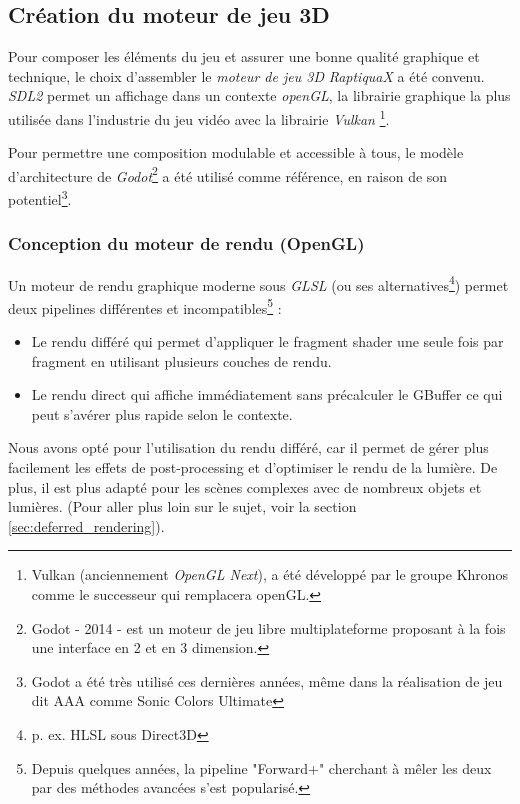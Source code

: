 \subsection{Création du moteur de jeu 3D}
    Pour composer les éléments du jeu et assurer une bonne qualité
    graphique et technique, le choix d'assembler le \emph{moteur de jeu 3D}
    \og \emph{RaptiquaX} \fg{} a été convenu. \emph{\Gls{SDL2}} permet un affichage dans un contexte
    \emph{\Gls{openGL}}, la librairie graphique la plus utilisée dans
    l'industrie du jeu vidéo avec la librairie \emph{Vulkan}
    \footnote{Vulkan \small{(anciennement \emph{OpenGL Next})}, a été
    développé par le groupe Khronos comme le successeur qui remplacera
    \Gls{openGL}.}.

    Pour permettre une composition modulable et accessible à tous, le modèle
    d'architecture de \emph{Godot}\footnote{Godot - 2014 - est un moteur de
    jeu libre multiplateforme proposant à la fois une interface en 2 et
    en 3 dimension.} a été utilisé comme référence, en raison de son
    potentiel\footnote{Godot a été très utilisé ces dernières années, même
    dans la réalisation de jeu dit AAA comme
    Sonic Colors Ultimate\cite{soniccoloru} }.

\subsubsection{Conception du moteur de rendu (OpenGL)}
    Un moteur de rendu graphique moderne sous \emph{\Gls{GLSL}} (ou ses
    alternatives\footnote{p. ex. HLSL sous Direct3D}) permet deux pipelines
    différentes et incompatibles\footnote{Depuis quelques années, la pipeline
    "Forward+" cherchant à mêler les deux par des méthodes avancées s'est
    popularisé.} \cite{iehl_deferred_vs_forward} :\\
    \begin{itemize}
        \item Le rendu différé qui permet d'appliquer le \gls{fragment shader}
        une seule fois par \gls{fragment} en utilisant plusieurs couches de
        rendu.
        \item Le rendu direct qui affiche immédiatement sans précalculer le
        \gls{GBuffer} ce qui peut s'avérer plus rapide selon le
        contexte.\\
    \end{itemize}

    Nous avons opté pour l'utilisation du rendu différé, car il permet de
    gérer plus facilement les effets de post-processing et d'optimiser le
    rendu de la lumière. De plus, il est plus adapté pour les scènes
    complexes avec de nombreux objets et lumières. (Pour aller plus loin sur
    le sujet, voir la section \ref{sec:deferred_rendering}).


